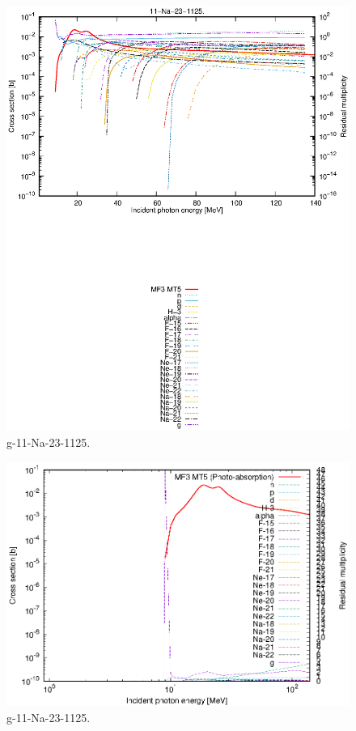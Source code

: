 \begin{figure}
 \includegraphics[width=\linewidth]{eps/g_11-Na-23_1125.eps}
  \caption{g-11-Na-23-1125.}
\end{figure}
\newpage \clearpage

\begin{figure}
 \includegraphics[width=\linewidth]{eps-log/g_11-Na-23_1125.eps}
 \caption{g-11-Na-23-1125.}
\end{figure}
\newpage \clearpage

